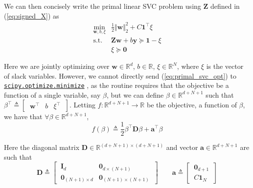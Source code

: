 \documentclass{article}
\numberwithin{equation}{section}
\newcommand{\minimize}{%
    \href{%
        https://docs.scipy.org/doc/scipy/reference/generated/%
        scipy.optimize.minimize.html%
    }{\texttt{scipy.optimize.minimize}}%
}
\begin{document}
We can then concisely write the primal linear SVC problem using
$ \mathbf{Z} $ defined in (\ref{eq:signed_X}) as
\begin{equation} \label{eq:primal_svc_opt}
    \begin{array}{ll}
        \displaystyle\min_{\mathbf{w}, b, \xi} &
            \frac{1}{2}\Vert\mathbf{w}\Vert_2^2 +
            C\mathbf{1}^\top\xi \\
        \text{s.t.} & \mathbf{Zw} + b\mathbf{y} \succeq
            \mathbf{1} - \xi  \\
            & \xi \succeq \mathbf{0}
    \end{array}
\end{equation}

Here we are jointly optimizing over $ \mathbf{w} \in \mathbb{R}^d $,
$ b \in \mathbb{R} $, $ \xi \in \mathbb{R}^N $, where $ \xi $ is the vector
of slack variables. However, we cannot directly send (\ref{eq:primal_svc_opt})
to \minimize, as the routine requires that the objective be a function of a
single variable, say $ \beta $, but we can define $ \beta \in
\mathbb{R}^{d + N + 1} $ such that $ \beta^\top \triangleq
\begin{bmatrix} \ \mathbf{w}^\top & b & \xi^\top \ \end{bmatrix} $. Letting
$ f : \mathbb{R}^{d + N + 1} \rightarrow \mathbb{R} $ be the objective, a
function of $ \beta $, we have that $ \forall \beta \in
\mathbb{R}^{d + N + 1} $,
\begin{equation} \label{eq:primal_obj_joint}
    f(\beta) \triangleq \frac{1}{2}\beta^\top\mathbf{D}\beta +
    \mathbf{a}^\top\beta
\end{equation}

Here the diagonal matrix $ \mathbf{D} \in \mathbb{R}^{(d + N + 1) \times
(d + N + 1)} $ and vector $ \mathbf{a} \in \mathbb{R}^{d + N + 1} $ are such
that
\begin{equation*} %
    \mathbf{D} \triangleq \begin{bmatrix}
        \ \mathbf{I}_d & \mathbf{0}_{d \times (N + 1)} \ \\
        \ \mathbf{0}_{(N + 1) \times d} & \mathbf{0}_{(N + 1) \times (N + 1)} \
    \end{bmatrix} \quad\quad \mathbf{a} \triangleq \begin{bmatrix}
        \ \mathbf{0}_{d + 1} \ \\ \ C\mathbf{1}_N \
    \end{bmatrix}
\end{equation*}
\end{document}
